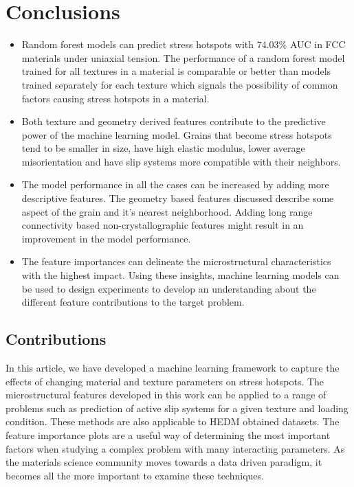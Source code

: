 \documentclass[preprint,1p,times,authoryear]{elsarticle}%
\begin{document}
\section{Conclusions}
\begin{itemize}
    \item Random forest models can predict stress hotspots with 74.03\% AUC in FCC materials under uniaxial tension. The performance of a random forest model trained for all textures in a material is comparable or better than models trained separately for each texture which signals the possibility of common factors causing stress hotspots in a material.
    \item Both texture and geometry derived features contribute to the predictive power of the machine learning model. Grains that become stress hotspots tend to be smaller in size, have high elastic modulus, lower average misorientation and have slip systems more compatible with their neighbors.%
    \item The model performance in all the cases can be increased by adding more descriptive features. The geometry based features discussed describe some aspect of the grain and it's nearest neighborhood. Adding long range connectivity based non-crystallographic features might result in an improvement in the model performance.
    \item The feature importances can delineate the microstructural characteristics with the highest impact. Using these insights, machine learning models can be used to design experiments to develop an understanding about the different feature contributions to the target problem.
   \end{itemize}

\subsection{Contributions}
In this article, we have developed a machine learning framework to capture the effects of changing material and texture parameters on stress hotspots. The microstructural features developed in this work can be applied to a range of problems such as prediction of active slip systems for a given texture and loading condition. These methods are also applicable to HEDM obtained datasets.  The feature importance plots are a useful way of determining the most important factors when studying a complex problem with many interacting parameters. As the materials science community moves towards a data driven paradigm, it becomes all the more important to examine these techniques.  
\end{document}
